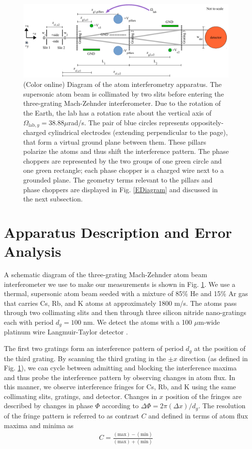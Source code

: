 \documentclass[twocolumn,prl,showpacs,superscriptaddress]{revtex4-1}   %
\newcommand{\figref}[1]{Fig. \ref{#1}}
\newcommand{\Omegalab}{\Omega_{\mathrm{lab},y}}
\begin{document}
\begin{figure}
\includegraphics[width=\linewidth,keepaspectratio]{IFM_diagram1.pdf}
\caption{\label{IFMDiagram}(Color online) Diagram of the atom interferometry apparatus. The supersonic atom beam is collimated by two slits before entering the three-grating Mach-Zehnder interferometer. Due to the rotation of the Earth, the lab has a rotation rate about the vertical axis of $\Omegalab = 38.88\mu$rad/s. 
The pair of blue circles represents oppositely-charged cylindrical electrodes (extending perpendicular to the page), that form a virtual ground plane between them. These pillars polarize the atoms and thus shift the interference pattern. 
The phase choppers are represented by the two groups of one green circle and one green rectangle; each phase chopper is a charged wire next to a grounded plane. The geometry terms relevant to the pillars and phase choppers are displayed in \figref{EDiagram} and discussed in the next subsection.}
\end{figure}

\section{Apparatus Description and Error Analysis}

A schematic diagram of the three-grating Mach-Zehnder atom beam interferometer we use to make our measurements is shown in \figref{IFMDiagram}. We use a thermal, supersonic atom beam \cite{Scoles} seeded with a mixture of 85\% He and 15\% Ar gas that carries Cs, Rb, and K atoms at approximately 1800 m/s. 
The atoms pass through two collimating slits and then through three silicon nitride nano-gratings each with period $d_g = 100$ nm. We detect the atoms with a 100 $\mu$m-wide platinum wire Langmuir-Taylor detector \cite{Delhuille2002}.

The first two gratings form an interference pattern of period $d_g$ at the position of the third grating. By scanning the third grating in the $\pm x$ direction (as defined in \figref{IFMDiagram}), we can cycle between admitting and blocking the interference maxima and thus probe the interference pattern by observing changes in atom flux. In this manner, we observe interference fringes for Cs, Rb, and K using the same collimating slits, gratings, and detector. Changes in $x$ position of the fringes are described by changes in phase $\Phi$ according to $\Delta\Phi = 2\pi(\Delta x)/d_g$. The resolution of the fringe pattern is referred to as contrast $C$ and defined in terms of atom flux maxima and minima as
\begin{align}
	C = \frac{(\mathrm{max}) - (\mathrm{min})}{(\mathrm{max}) + (\mathrm{min})}
	\label{contrastDef}
\end{align}
\end{document}
